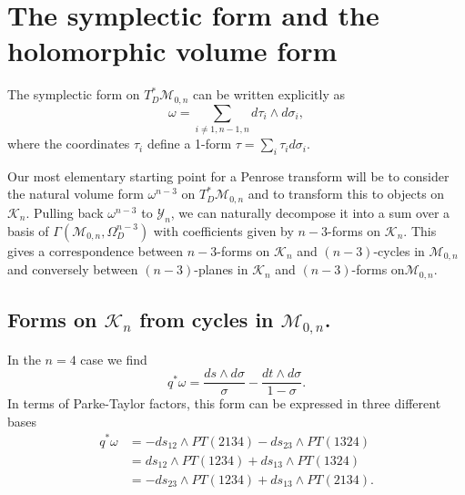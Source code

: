 \documentclass[11pt]{article}
\newcommand{\cK}{\mathcal{K}}
\newcommand{\cM}{\mathcal{M}}
\newcommand{\cY}{\mathcal{Y}}
\newcommand{\1}{{\rm 1\hskip-0.25em I}}
\begin{document}
\section{The symplectic form and the holomorphic volume form}
The symplectic form on $T^*_D\cM_{0,n}$ can be written explicitly as
$$
\omega = \sum_{i\neq 1,n-1,n} d\tau_i \wedge d\sigma_i,
$$
where the coordinates $\tau_i$ define a 1-form $\tau = \sum_i \tau_id\sigma_i$. 


Our most elementary starting point for a Penrose transform will be to consider the natural volume form $\omega^{n-3}$ on $T^*_D\cM_{0,n}$ and to transform this to objects on $\cK_n$. Pulling back $\omega^{n-3}$ to $\cY_n$, we can  naturally decompose it into a sum over  a basis of $\Gamma(\cM_{0,n},\Omega^{n-3}_D)$ with coefficients given by $n-3$-forms on $\cK_n$.  This gives a correspondence between $n-3$-forms on $\cK_n$ and $(n-3)$-cycles in $\cM_{0,n}$ and conversely between $(n-3)$-planes in $\cK_n$ and $(n-3)$-forms on$\cM_{0,n}$.


\subsection{Forms on $\cK_n$ from cycles in $\cM_{0,n}$.} 
In the $n=4$  case we find
$$
q^*\omega = \frac{ds\wedge d\sigma}{\sigma} - \frac{dt\wedge d\sigma}{1-\sigma}.
$$
In terms of Parke-Taylor factors, this form can be expressed in three  different bases
\begin{align}
q^* \omega & = -ds_{12} \wedge PT(2134) - ds_{23} \wedge PT(1324) \nonumber\\
& = ds_{12}\wedge PT(1234) + ds_{13}\wedge PT(1324)\nonumber\\
& = -ds_{23}\wedge PT(1234) + ds_{13}\wedge PT(2134).
\end{align}
\end{document}

